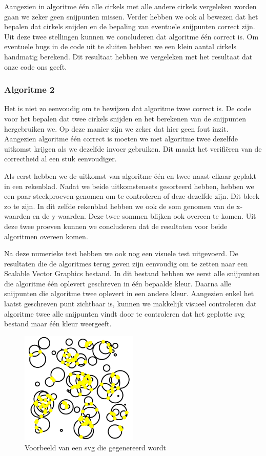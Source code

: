 \documentclass[11pt,a4paper]{article}
\begin{document}
Aangezien in algoritme \'e\'en alle cirkels met alle andere cirkels vergeleken worden gaan we zeker geen snijpunten missen. Verder hebben we ook al bewezen dat het bepalen dat cirkels snijden en de bepaling van eventuele snijpunten correct zijn. Uit deze twee stellingen kunnen we concluderen dat algoritme \'e\'en correct is.
Om eventuele bugs in de code uit te sluiten hebben we een klein aantal cirkels handmatig berekend. Dit resultaat hebben we vergeleken met het resultaat dat onze code ons geeft.

\subsubsection{Algoritme 2}


Het is niet zo eenvoudig om te bewijzen dat algoritme twee correct is. De code voor het bepalen dat twee cirkels snijden en het berekenen van de snijpunten hergebruiken we. Op deze manier zijn we zeker dat hier geen fout inzit.
Aangezien algoritme \'e\'en correct is moeten we met algoritme twee dezelfde uitkomst krijgen als we dezelfde invoer gebruiken. Dit maakt het verifi\"eren van de correctheid al een stuk eenvoudiger.

Als eerst hebben we de uitkomst van algoritme \'e\'en en twee naast elkaar geplakt in een rekenblad. Nadat we beide uitkomstensets gesorteerd hebben, hebben we een paar steekproeven genomen om te controleren of deze dezelfde zijn. Dit bleek zo te zijn. In dit zelfde rekenblad hebben we ook de som genomen van de x-waarden en de y-waarden. Deze twee sommen blijken ook overeen te komen. Uit deze twee proeven kunnen we concluderen dat de resultaten voor beide algoritmen overeen komen.

Na deze numerieke test hebben we ook nog een visuele test uitgevoerd. De resultaten die de algoritmes terug geven zijn eenvoudig om te zetten naar een Scalable Vector Graphics bestand. In dit bestand hebben we eerst alle snijpunten die algoritme \'e\'en oplevert geschreven in \'e\'en bepaalde kleur. Daarna alle snijpunten die algoritme twee oplevert in een andere kleur. Aangezien enkel het laatst geschreven punt zichtbaar is, kunnen we makkelijk visueel controleren dat algoritme twee alle snijpunten vindt door te controleren dat het geplotte svg bestand maar \'e\'en kleur weergeeft.

\begin{figure}[H]
\centering
\includegraphics[width=0.5\textwidth]{vb_svg.png}
\caption*{Voorbeeld van een svg die gegenereerd wordt}
\end{figure}
\end{document}
